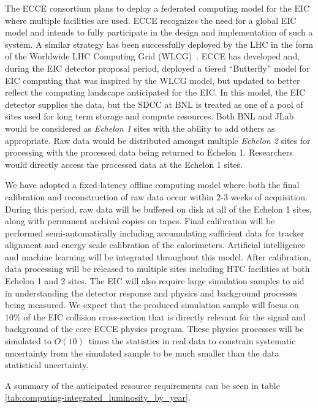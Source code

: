 
The ECCE consortium plans to deploy a federated computing model for the EIC where multiple facilities are used. ECCE recognizes the need for a global EIC model and intends to fully participate in the design and implementation of such a system. A similar strategy has been successfully deployed by the LHC in the form of the Worldwide LHC Computing Grid (WLCG)~\cite{SHIERS2007219}. ECCE has developed and, during the EIC detector proposal period, deployed a tiered ``Butterfly'' model for EIC computing that was inspired by the WLCG model, but updated to better reflect the computing landscape anticipated for the EIC. In this model, the EIC detector supplies the data, but the SDCC at BNL is treated as one of a pool of sites used for long term storage and compute resources. Both BNL and JLab would be considered as \emph{Echelon 1} sites with the ability to add others as appropriate. Raw data would be distributed amongst multiple \emph{Echelon 2} sites for processing with the processed data being returned to Echelon 1. Researchers would directly access the processed data at the Echelon 1 sites.

We have adopted a fixed-latency offline computing model where both the final calibration and reconstruction of raw data occur within 2-3 weeks of acquisition. During this period, raw data will be buffered on disk at all of the Echelon 1 sites, along with permanent archival copies on tapes. Final calibration will be performed semi-automatically including accumulating sufficient data for tracker alignment and energy scale calibration of the calorimeters. Artificial intelligence and machine learning will be integrated throughout this model. After calibration, data processing  will be released to multiple sites including HTC facilities at both Echelon 1 and 2 sites. The EIC will also require large simulation samples to aid in understanding the detector response and physics and background processes being measured.
 We expect that the produced simulation sample will focus on 10\% of the EIC collision cross-section that is directly relevant for the signal and background of the core ECCE physics program. These physics processes will be simulated to $O(10)$~times the statistics in real data to constrain systematic uncertainty from the simulated sample to be much smaller than the data statistical uncertainty.

A summary of the anticipated resource requirements can be seen in table \ref{tab:computing-integrated_luminosity_by_year}.


